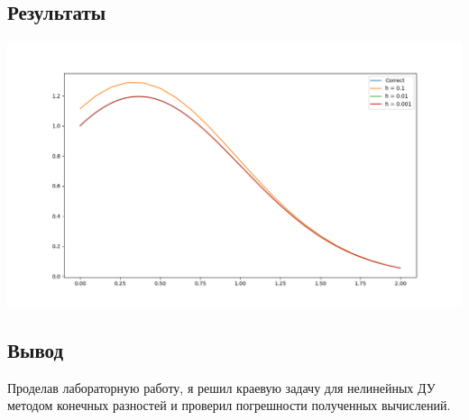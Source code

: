 \documentclass{article}
\begin{document}
\subsection*{Результаты}
\begin{center}
\includegraphics[scale=0.25]{img/img01.png}
\end{center}


\subsection*{Вывод}
Проделав лабораторную работу, я решил краевую задачу для нелинейных ДУ 
методом конечных разностей и проверил погрешности полученных вычислений.
\end{document}
